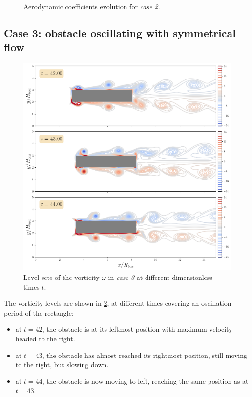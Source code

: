 \documentclass[11 pt]{article}
\begin{document}
\begin{figure}[H]
    \centering
    
    \caption{Aerodynamic coefficients evolution for \textit{case 2}.}
    \label{fig:drag_case2}
\end{figure}


\subsection{Case 3: obstacle oscillating with symmetrical flow}

\begin{figure}[H]
    \centering
    \includegraphics[width=\textwidth]{../figures/vorticity_case_3.png}
    \caption{Level sets of the vorticity $\omega$ in \textit{case 3} at different dimensionless times $t$.}
    \label{fig:vorticity_3}
\end{figure}

The vorticity levels are shown in \ref{fig:vorticity_3}, at different times covering an oscillation period of the rectangle:
\begin{itemize}
    \item at $t=42$, the obstacle is at its leftmost position with maximum velocity headed to the right.
    \item at $t=43$, the obstacle has almost reached its rightmost position, still moving to the right, but slowing down.
    \item at $t=44$, the obstacle is now moving to left, reaching the same position as at $t=43$.
\end{itemize}
\end{document}
